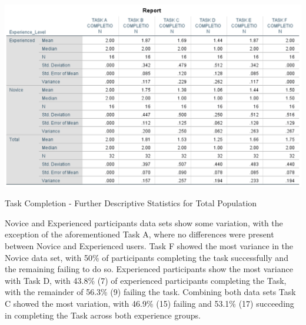 \begin{table}[H]
\includegraphics[width=\linewidth]{Screenshots/UXResearchDataFiles/UXTaskCompletionData/TaskCOMPLETIONOVERALLDESCRIPTIVEEdited.png}
\label{DescriptiveTaskCompletionAllTasks}
\caption{Task Completion - Further Descriptive Statistics for Total Population}
\end{table}

Novice and Experienced participants data sets show some variation, with the exception of the aforementioned Task A, where no differences were present between Novice and Experienced users. Task F showed the most variance in the Novice data set, with 50\% of participants completing the task successfully and the remaining failing to do so. Experienced participants show the most variance with Task D, with 43.8\% (7) of experienced participants completing the Task, with the remainder of 56.3\% (9) failing the task. Combining both data sets Task C showed the most variation, with 46.9\% (15) failing and 53.1\% (17) succeeding in completing the Task across both experience groups. 


